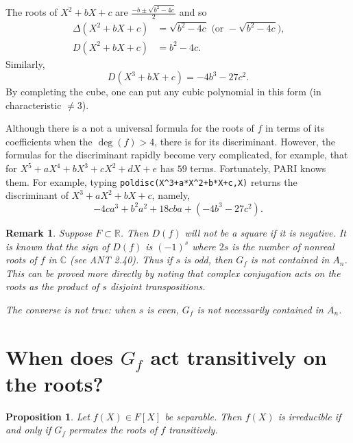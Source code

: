 \documentclass[a4paper,11pt,final,openany]{memoir}
\newtheorem{proposition}[X]{Proposition}
\newtheorem{remark}[X]{Remark}
\theoremstyle{nonumberplain}
\begin{document}
The roots of $X^{2}\allowbreak+bX+c$ are $\frac{-b\pm\sqrt{b^{2}-4c}}{2}$ and
so%
\begin{align*}
\Delta(X^{2}\allowbreak+bX+c)  &  =\sqrt{b^{2}-4c}\text{ (or }-\sqrt{b^{2}%
-4c}\text{),}\\
D(X^{2}\allowbreak+bX+c)  &  =b^{2}-4c.
\end{align*}
Similarly, \qquad%
\[
D(X^{3}+bX+c)=-4b^{3}-27c^{2}.
\]
By completing the cube, one can put any cubic polynomial in this form (in
characteristic $\neq3$).

Although there is a not a universal formula for the roots of $f$ in terms of
its coefficients when the $\deg(f)>4$, there is for its discriminant. However,
the formulas for the discriminant rapidly become very complicated, for
example, that for $X^{5}+aX^{4}+bX^{3}+cX^{2}+dX+e$ has $59$ terms.
Fortunately, PARI%
knows them. For example, typing \verb|poldisc(X^3+a*X^2+b*X+c,X)| returns the
discriminant of $X^{3}+aX^{2}+bX+c$, namely,
\[
-4ca^{3}+b^{2}a^{2}+18cba+(-4b^{3}-27c^{2}).
\]


\begin{remark}
\label{cg3}Suppose $F\subset\mathbb{R}$. Then $D(f)$ will not be a square if
it is negative. It is known that the sign of $D(f)$ is $(-1)^{s}$ where $2s$
is the number of nonreal roots of $f$ in $\mathbb{C}$ (see ANT 2.40). Thus if
$s$ is odd, then $G_{f}$ is not contained in $A_{n}$. This can be proved more
directly by noting that complex conjugation acts on the roots as the product
of $s$ disjoint transpositions.

The converse is not true: when $s$ is even, $G_{f}$ is not necessarily
contained in $A_{n}$.
\end{remark}

\section{When does \texorpdfstring{$G_{f}$}{Gf} act transitively on the
roots?}

\begin{proposition}
\label{cg4} Let $f(X)\in F[X]$ be separable. Then $f(X)$ is irreducible if and
only if $G_{f}$ permutes the roots of $f$ transitively.
\end{proposition}
\end{document}
